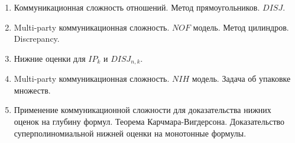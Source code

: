 \begin{enumerate}
    \item Коммуникационная сложность отношений. Метод прямоугольников. $DISJ$.


	\item Multi-party коммуникационная сложность. $NOF$ модель. Метод цилиндров. Discrepancy.
	\item Нижние оценки для $IP_k$ и $DISJ_{n, k}$.
	\item Multi-party коммуникационная сложность. $NIH$ модель. Задача об упаковке множеств.

	\item Применение коммуникационной сложности для доказательства нижних оценок на глубину формул. Теорема
		Карчмара-Вигдерсона. Доказательство суперполиномиальной нижней оценки на монотонные формулы.


\end{enumerate}




